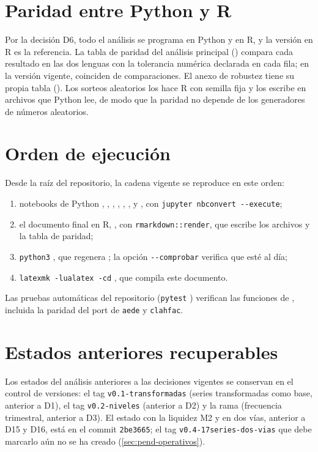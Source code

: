 \section{Paridad entre Python y R}
\label{sec:ap-paridad}

Por la decisión D6, todo el análisis se programa en Python y en R, y la versión en R es la
referencia. La tabla de paridad del análisis principal
() compara cada resultado en las dos lenguas con
la tolerancia numérica declarada en cada fila; en la versión vigente, coinciden
\filasParidadCoinciden{}
de \filasParidad{} comparaciones. El anexo de
robustez tiene su propia tabla (). Los
sorteos aleatorios los hace R con semilla fija y los escribe en archivos que Python lee, de modo
que la paridad no depende de los generadores de números aleatorios.

\section{Orden de ejecución}
\label{sec:ap-orden}

Desde la raíz del repositorio, la cadena vigente se reproduce en este orden:

\begin{enumerate}[leftmargin=*]
  \item notebooks de Python , ,
    , , ,
    ,  y , con
    \texttt{jupyter nbconvert -{}-execute};
  \item el documento final en R, , con
    \texttt{rmarkdown::render}, que escribe los archivos  y la tabla de paridad;
  \item \texttt{python3} , que regenera
    ; la opción \texttt{-{}-comprobar} verifica que esté al día;
  \item \texttt{latexmk -lualatex -cd} , que compila este documento.
\end{enumerate}

Las pruebas automáticas del repositorio (\texttt{pytest} ) verifican las funciones de
, incluida la paridad del port de \texttt{aede} y \texttt{clahfac}.

\section{Estados anteriores recuperables}
\label{sec:ap-estados}

Los estados del análisis anteriores a las decisiones vigentes se conservan en el control de
versiones: el tag \texttt{v0.1-transformadas} (series transformadas como base, anterior a D1), el
tag \texttt{v0.2-niveles} (anterior a D2) y la rama  (frecuencia
trimestral, anterior a D3). El estado con la liquidez M2 y en dos vías, anterior a D15 y D16, está en el
commit \texttt{2be3665}; el tag \texttt{v0.4-17series-dos-vias} que debe marcarlo aún no se ha
creado (\cref{sec:pend-operativos}).
